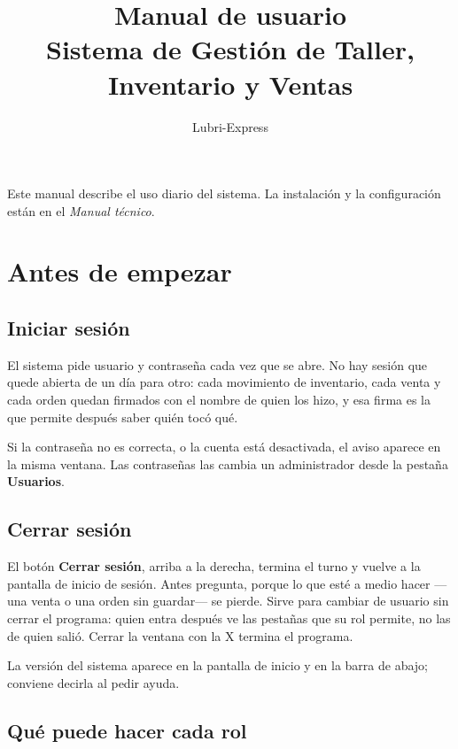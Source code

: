\documentclass[11pt,a4paper]{article}
\title{\vspace{-1.5cm}\textbf{Manual de usuario}\\[0.3cm]
       \large Sistema de Gestión de Taller, Inventario y Ventas}
\author{Lubri-Express}
\date{}
\begin{document}
\maketitle
\thispagestyle{empty}

\noindent Este manual describe el uso diario del sistema. La instalación y la
configuración están en el \emph{Manual técnico}.

\tableofcontents
\newpage

\section{Antes de empezar}

\subsection{Iniciar sesión}

El sistema pide usuario y contraseña cada vez que se abre. No hay sesión que
quede abierta de un día para otro: cada movimiento de inventario, cada venta y
cada orden quedan firmados con el nombre de quien los hizo, y esa firma es la
que permite después saber quién tocó qué.


Si la contraseña no es correcta, o la cuenta está desactivada, el aviso aparece
en la misma ventana. Las contraseñas las cambia un administrador desde la
pestaña \textbf{Usuarios}.

\subsection{Cerrar sesión}

El botón \textbf{Cerrar sesión}, arriba a la derecha, termina el turno y vuelve
a la pantalla de inicio de sesión. Antes pregunta, porque lo que esté a medio
hacer ---una venta o una orden sin guardar--- se pierde. Sirve para cambiar de
usuario sin cerrar el programa: quien entra después ve las pestañas que su rol
permite, no las de quien salió. Cerrar la ventana con la X termina el programa.

La versión del sistema aparece en la pantalla de inicio y en la barra de abajo;
conviene decirla al pedir ayuda.

\subsection{Qué puede hacer cada rol}
\end{document}
